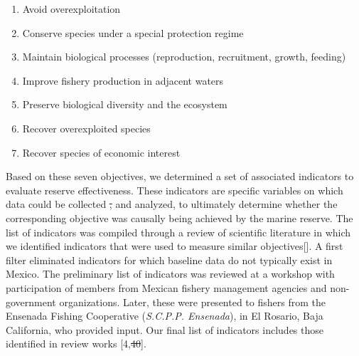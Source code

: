 \documentclass[12pt,]{article}
\providecommand{\tightlist}{%
  \setlength{\itemsep}{0pt}\setlength{\parskip}{0pt}}
\providecommand{\DIFaddtex}[1]{{\protect\color{blue}\uwave{#1}}} %
\providecommand{\DIFdeltex}[1]{{\protect\color{red}\sout{#1}}}                      %
\providecommand{\DIFaddbegin}{} %
\providecommand{\DIFaddend}{} %
\providecommand{\DIFdelbegin}{} %
\providecommand{\DIFdelend}{} %
\providecommand{\DIFadd}[1]{\texorpdfstring{\DIFaddtex{#1}}{#1}} %
\providecommand{\DIFdel}[1]{\texorpdfstring{\DIFdeltex{#1}}{}} %
\newcommand{\DIFscaledelfig}{0.5}
\newlength{\DIFdelgraphicswidth} %
\newlength{\DIFdelgraphicsheight} %
\newcommand{\DIFaddincludegraphics}[2][]{{\color{blue}\fbox{\DIFOincludegraphics[#1]{#2}}}} %
\newcommand{\DIFdelincludegraphics}[2][]{%
\sbox{\DIFdelgraphicsbox}{\DIFOincludegraphics[#1]{#2}}%
\settoboxwidth{\DIFdelgraphicswidth}{\DIFdelgraphicsbox} %
\settoboxtotalheight{\DIFdelgraphicsheight}{\DIFdelgraphicsbox} %
\scalebox{\DIFscaledelfig}{%
\parbox[b]{\DIFdelgraphicswidth}{\usebox{\DIFdelgraphicsbox}\\[-\baselineskip] \rule{\DIFdelgraphicswidth}{0em}}\llap{\resizebox{\DIFdelgraphicswidth}{\DIFdelgraphicsheight}{%
\setlength{\unitlength}{\DIFdelgraphicswidth}%
\begin{picture}(1,1)%
\thicklines\linethickness{2pt} %
{\color[rgb]{1,0,0}\put(0,0){\framebox(1,1){}}}%
{\color[rgb]{1,0,0}\put(0,0){\line( 1,1){1}}}%
{\color[rgb]{1,0,0}\put(0,1){\line(1,-1){1}}}%
\end{picture}%
}\hspace*{3pt}}} %
} %
\DeclareRobustCommand{\DIFaddbegin}{\DIFOaddbegin \let\includegraphics\DIFaddincludegraphics} %
\DeclareRobustCommand{\DIFaddend}{\DIFOaddend \let\includegraphics\DIFOincludegraphics} %
\DeclareRobustCommand{\DIFdelbegin}{\DIFOdelbegin \let\includegraphics\DIFdelincludegraphics} %
\DeclareRobustCommand{\DIFdelend}{\DIFOaddend \let\includegraphics\DIFOincludegraphics} %
\begin{document}
\begin{enumerate}
\def\labelenumi{\arabic{enumi}.}
\tightlist
\item
  Avoid overexploitation
\item
  Conserve species under a special protection regime
\item
  Maintain biological processes (reproduction, recruitment, growth,
  feeding)
\item
  Improve fishery production in adjacent waters
\item
  Preserve biological diversity and the ecosystem
\item
  Recover overexploited species
\item
  Recover species of economic interest
\end{enumerate}

Based on these seven objectives, we determined a set of associated
indicators to evaluate reserve effectiveness. These indicators are
specific variables on which data could be collected \DIFdelbegin \DIFdel{, }\DIFdelend and analyzed, to
ultimately determine whether the corresponding objective was causally
being achieved by the marine reserve. The list of indicators was
compiled through a review of scientific literature in which we
identified indicators that were used to measure similar
objectives\DIFaddbegin {[}\DIFadd{3--5,7,11,13,14,18--21,23,24,41--44}{]}\DIFaddend . A first filter
eliminated indicators for which baseline data do not typically exist in
Mexico. The preliminary list of indicators was reviewed at a workshop
with participation of members from Mexican fishery management agencies
and non-government organizations. Later, these were presented to fishers
from the Ensenada Fishing Cooperative (\emph{S.C.P.P. Ensenada}), in El
Rosario, Baja California, who provided input. Our final list of
indicators includes those identified in review works {[}4,\DIFdelbegin \DIFdel{40}\DIFdelend \DIFaddbegin \DIFadd{44}\DIFaddend {]}.
\end{document}
